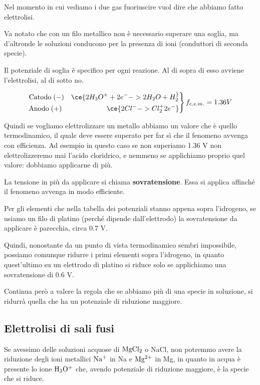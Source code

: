 Nel momento in cui vediamo i due gas fuoriuscire vuol dire che abbiamo fatto elettrolisi.

Va notato che con un filo metallico non è necessario superare una soglia, ma d'altronde le soluzioni conducono per la presenza di ioni (conduttori di seconda specie).

Il potenziale di soglia è specifico per ogni reazione. Al di sopra di esso avviene l'elettrolisi, al di sotto no.

\begin{equation*}
    \left.\begin{aligned}
    \text{Catodo} \; (-) \quad \ce{2H_3O^+ + 2e^- -> 2H_2O + H_2 ^}\\
    \text{Anodo} \; (+) \hspace{1.9cm} \quad \ce{2Cl^- -> Cl_2 ^ + 2 e^-}
  \end{aligned}\right\} f_{c.e.m.}=1.36 V
\end{equation*}

Quindi se vogliamo elettrolizzare un metallo abbiamo un valore che è quello termodinamico, il quale deve essere superato per far sì che il fenomeno avvenga con efficienza. Ad esempio in questo caso se non superiamo 1.36 V non elettrolizzeremo mai l'acido cloridrico, e nemmeno se applichiamo proprio quel valore: dobbiamo applicarne di più. 

La tensione in più da applicare si chiama \textbf{sovratensione}. Essa si applica affinché il fenomeno avvenga in modo efficiente.

Per gli elementi che nella tabella dei potenziali stanno appena sopra l'idrogeno, se usiamo un filo di platino (perché dipende dall'elettrodo) la sovratensione da applicare è parecchia, circa 0.7 V.

Quindi, nonostante da un punto di vista termodinamico sembri impossibile, possiamo comunque ridurre i primi elementi sopra l'idrogeno, in quanto quest'ultimo su un elettrodo di platino si riduce solo se applichiamo una sovratensione di 0.6 V.

Continua però a valere la regola che se abbiamo più di una specie in soluzione, si ridurrà quella che ha un potenziale di riduzione maggiore.

\subsection{Elettrolisi di sali fusi}

Se avessimo delle soluzioni acquose di $\rm MgCl_2$ o NaCl, non potremmo avere la riduzione degli ioni metallici $\rm Na^+$ in Na e $\rm Mg^{2+}$ in Mg, in quanto in acqua è presente lo ione $\rm H_3O^+$ che, avendo potenziale di riduzione maggiore, è la specie che si riduce.

